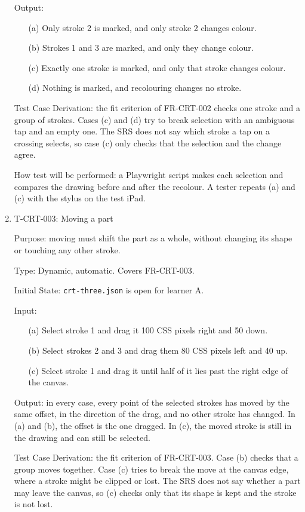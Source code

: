 \documentclass[12pt, titlepage]{article}
\newcommand{\testitem}[1]{\item #1\par\nopagebreak}
\begin{document}
\begin{enumerate}
Output:
\begin{itemize}
\item[(a)] Only stroke 2 is marked, and only stroke 2 changes colour.
\item[(b)] Strokes 1 and 3 are marked, and only they change colour.
\item[(c)] Exactly one stroke is marked, and only that stroke changes colour.
\item[(d)] Nothing is marked, and recolouring changes no stroke.
\end{itemize}

Test Case Derivation: the fit criterion of FR-CRT-002 checks one stroke and a
group of strokes. Cases (c) and (d) try to break selection with an ambiguous
tap and an empty one. The SRS does not say which stroke a tap on a crossing
selects, so case (c) only checks that the selection and the change agree.

How test will be performed: a Playwright script makes each selection and
compares the drawing before and after the recolour. A tester repeats (a)
and (c) with the stylus on the test iPad.

\testitem{T-CRT-003: Moving a part}

Purpose: moving must shift the part as a whole, without changing its shape or
touching any other stroke.

Type: Dynamic, automatic. Covers FR-CRT-003.

Initial State: \texttt{crt-three.json} is open for learner A.

Input:
\begin{itemize}
\item[(a)] Select stroke 1 and drag it 100 CSS pixels right and 50 down.
\item[(b)] Select strokes 2 and 3 and drag them 80 CSS pixels left and 40 up.
\item[(c)] Select stroke 1 and drag it until half of it lies past the right
edge of the canvas.
\end{itemize}

Output: in every case, every point of the selected strokes has moved by the
same offset, in the direction of the drag, and no other stroke has changed.
In (a) and (b), the offset is the one dragged. In (c), the moved stroke is
still in the drawing and can still be selected.

Test Case Derivation: the fit criterion of FR-CRT-003. Case (b) checks that
a group moves together. Case (c) tries to break the move at the canvas edge,
where a stroke might be clipped or lost. The SRS does not say whether a part
may leave the canvas, so (c) checks only that its shape is kept and the
stroke is not lost.


\end{enumerate}
\end{document}
